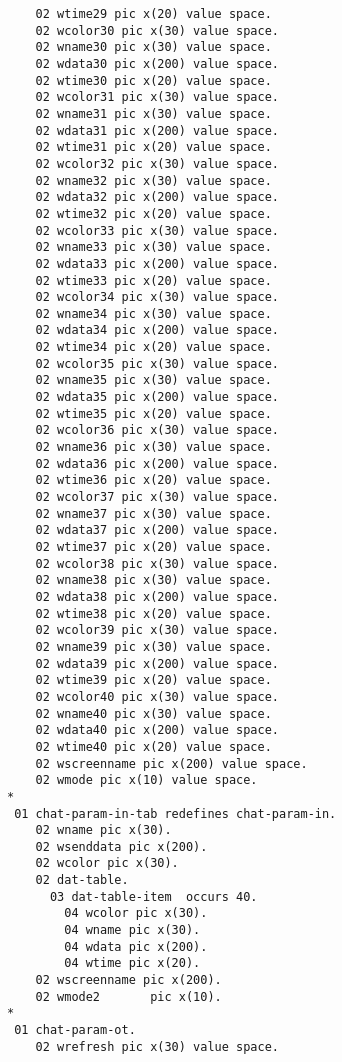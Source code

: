 {{{\begin{verbatim}
          02 wtime29 pic x(20) value space.
          02 wcolor30 pic x(30) value space.
          02 wname30 pic x(30) value space.
          02 wdata30 pic x(200) value space.
          02 wtime30 pic x(20) value space.
          02 wcolor31 pic x(30) value space.
          02 wname31 pic x(30) value space.
          02 wdata31 pic x(200) value space.
          02 wtime31 pic x(20) value space.
          02 wcolor32 pic x(30) value space.
          02 wname32 pic x(30) value space.
          02 wdata32 pic x(200) value space.
          02 wtime32 pic x(20) value space.
          02 wcolor33 pic x(30) value space.
          02 wname33 pic x(30) value space.
          02 wdata33 pic x(200) value space.
          02 wtime33 pic x(20) value space.
          02 wcolor34 pic x(30) value space.
          02 wname34 pic x(30) value space.
          02 wdata34 pic x(200) value space.
          02 wtime34 pic x(20) value space.
          02 wcolor35 pic x(30) value space.
          02 wname35 pic x(30) value space.
          02 wdata35 pic x(200) value space.
          02 wtime35 pic x(20) value space.
          02 wcolor36 pic x(30) value space.
          02 wname36 pic x(30) value space.
          02 wdata36 pic x(200) value space.
          02 wtime36 pic x(20) value space.
          02 wcolor37 pic x(30) value space.
          02 wname37 pic x(30) value space.
          02 wdata37 pic x(200) value space.
          02 wtime37 pic x(20) value space.
          02 wcolor38 pic x(30) value space.
          02 wname38 pic x(30) value space.
          02 wdata38 pic x(200) value space.
          02 wtime38 pic x(20) value space.
          02 wcolor39 pic x(30) value space.
          02 wname39 pic x(30) value space.
          02 wdata39 pic x(200) value space.
          02 wtime39 pic x(20) value space.
          02 wcolor40 pic x(30) value space.
          02 wname40 pic x(30) value space.
          02 wdata40 pic x(200) value space.
          02 wtime40 pic x(20) value space.
          02 wscreenname pic x(200) value space.
          02 wmode pic x(10) value space.
      *
       01 chat-param-in-tab redefines chat-param-in.
          02 wname pic x(30).
          02 wsenddata pic x(200).
          02 wcolor pic x(30).
          02 dat-table.
            03 dat-table-item  occurs 40.
              04 wcolor pic x(30).
              04 wname pic x(30).
              04 wdata pic x(200).
              04 wtime pic x(20).
          02 wscreenname pic x(200).
          02 wmode2       pic x(10).
      *
       01 chat-param-ot.
          02 wrefresh pic x(30) value space.

\end{verbatim}}}}

